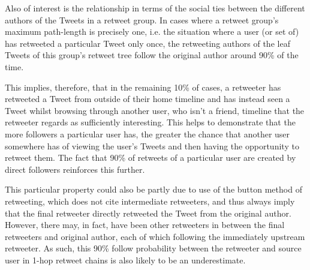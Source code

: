 Also of interest is the relationship in terms of the social ties between the different authors of the Tweets in a retweet group. In cases where a retweet group's maximum path-length is precisely one, i.e. the situation where a user (or set of) has retweeted a particular Tweet only once, the retweeting authors of the leaf Tweets of this group's retweet tree follow the original author around 90\% of the time.

This implies, therefore, that in the remaining 10\% of cases, a retweeter has retweeted a Tweet from outside of their home timeline and has instead seen a Tweet whilst browsing through another user, who isn't a friend, timeline that the retweeter regards as sufficiently interesting. This helps to demonstrate that the more followers a particular user has, the greater the chance that another user somewhere has of viewing the user's Tweets and then having the opportunity to retweet them. The fact that 90\% of retweets of a particular user are created by direct followers reinforces this further.

This particular property could also be partly due to use of the button method of retweeting, which does not cite intermediate retweeters, and thus always imply that the final retweeter directly retweeted the Tweet from the original author. However, there may, in fact, have been other retweeters in between the final retweeters and original author, each of which following the immediately upstream retweeter. As such, this 90\% follow probability between the retweeter and source user in 1-hop retweet chains is also likely to be an underestimate.


